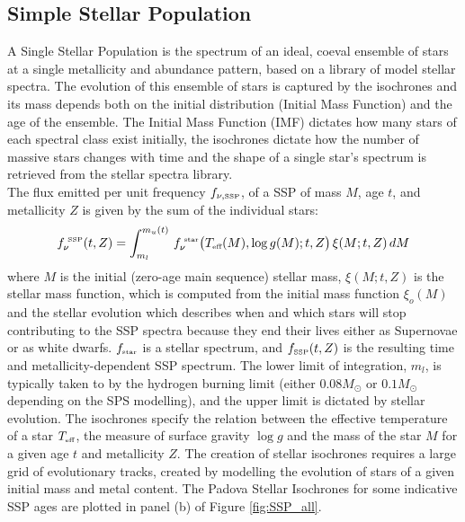 \subsection{Simple Stellar Population}
A Single Stellar Population is the spectrum of an ideal, coeval ensemble of stars at a single metallicity and abundance pattern, based on a library of model stellar spectra. The evolution of this ensemble of stars is captured by the isochrones and its mass depends both on the initial distribution (Initial Mass Function) and the age of the ensemble. The Initial Mass Function (IMF) dictates how many stars of each spectral class exist initially, the isochrones dictate how the number of massive stars changes with time and the shape of a single star's spectrum is retrieved from the stellar spectra library.\\
The flux emitted per unit frequency $f_{\nu, \text{\tiny{SSP}}}$, of a SSP of mass $M$, age $t$, and metallicity $Z$ is given\cite{Conroy2013} by the sum of the individual stars:
\begin{equation}
    f_\nu ^{\text{\tiny{ SSP}}}(t,Z) = \int_{m_l}^{m_u(t)} \, f_\nu^{\text{\tiny{ star}}}\big(T_{\text{\tiny{eff}}} (M), \log g(M) ; t, Z \big)\, \xi(M ; t, Z) \,dM \label{eq:SSP}
\end{equation}
where $M$ is the initial (zero-age main sequence) stellar mass, $\xi(M ; t, Z)$ is the stellar mass function, which is computed from the initial mass function $\xi_o(M )$ and the stellar evolution which describes when and which stars will stop contributing to the SSP spectra because they end their lives either
as Supernovae or as white dwarfs\cite{Walcher2011}. $f_{\text{\tiny{star}}}$ is a stellar spectrum, and $f_{\text{\tiny{SSP}}}(t,Z)$ is the resulting time and metallicity-dependent SSP spectrum. The lower limit of integration, $m_l$, is typically\cite{Conroy2013} taken to by the hydrogen burning limit (either $0.08 M_\odot$ or $0.1 M_\odot$ depending on the SPS modelling), and the upper limit is dictated by stellar evolution. 
The isochrones specify the relation\cite{Conroy2013} between the effective temperature of a star $T_{\text{\tiny{eff}}}$, the measure of surface gravity $\log g$ and the mass of the star $M$ for a given age $t$ and metallicity $Z$. The creation of stellar isochrones requires\cite{Walcher2011} a large grid of evolutionary tracks, created by modelling the evolution of stars of a given initial mass and metal content. The Padova\cite{Padova1994} \cite{Padova2000} \cite{Padova2008} Stellar Isochrones for some indicative SSP ages are plotted in panel (b) of Figure \ref{fig:SSP_all}.
